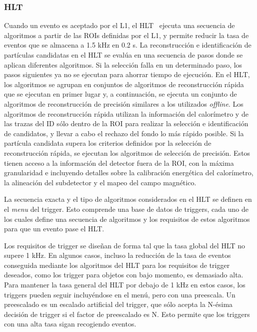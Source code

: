 \subsubsection{\acf{HLT}}


Cuando un evento es aceptado por el \ac{L1}, el \ac{HLT}~\cite{ATLAS-HLTTrigger} ejecuta una secuencia de algoritmos a partir de las \acp{ROI} definidas por el \ac{L1}, y permite reducir la tasa de eventos que se almacena a 1.5 kHz en 0.2 s.
La reconstrucción e identificación de partículas candidatas en el \ac{HLT} se evalúa en una secuencia de pasos donde se aplican diferentes algoritmos.
Si la selección falla en un determinado paso, los pasos siguientes ya no se ejecutan para ahorrar tiempo de ejecución.
En el \ac{HLT}, los algoritmos se agrupan en conjuntos de algoritmos de reconstrucción rápida que se ejecutan en primer lugar y, a continuación, se ejecuta un conjunto de algoritmos de reconstrucción de precisión similares a los utilizados \textit{offline}.
Los algoritmos de reconstrucción rápida utilizan la información del calorímetro y de las trazas del \ac{ID} sólo dentro de la \ac{ROI} para realizar la selección e identificación de candidatos, y llevar a cabo el rechazo del fondo lo más rápido posible.
Si la partícula candidata supera los criterios definidos por la selección de reconstrucción rápida, se ejecutan los algoritmos de selección de precisión. Estos tienen acceso a la información del detector fuera de la \ac{ROI}, con la máxima granularidad e incluyendo detalles sobre la calibración energética del calorímetro, la alineación del subdetector y el mapeo del campo magnético.

La secuencia exacta y el tipo de algoritmos considerados en el \ac{HLT} se definen en el \textit{menu} del trigger. Esto comprende una base de datos de triggers, cada uno de los cuales define una secuencia de algoritmos y los requisitos de estos algoritmos para que un evento pase el \ac{HLT}.

Los requisitos de trigger se diseñan de forma tal que la tasa global del \ac{HLT} no supere 1 kHz. En algunos casos, incluso la reducción de la tasa de eventos conseguida mediante los algoritmos del \ac{HLT} para los requisitos de trigger deseados, como los trigger para objetos con bajo momento, es demasiado alta. Para mantener la tasa general del \ac{HLT} por debajo de 1 kHz en estos casos, los triggers pueden seguir incluyéndose en el menú, pero con una preescala. Un preescalado es un escalado artificial del trigger, que sólo acepta la N-ésima decisión de trigger si el factor de preescalado es N. Esto permite que los triggers con una alta tasa sigan recogiendo eventos.

